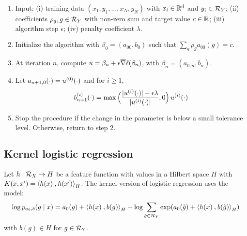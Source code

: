 \begin{algorithm}
\label{alg:log.lasso}
\begin{enumerate}[label=(\arabic*)]
\item Input: (i) training data $(x_1, y_1, \ldots, x_N, y_N)$ with $x_i\in {\mathbb{R}}^d$ and $y_i\in{\mathcal R}_Y$; (ii) coefficients $\rho_g, g\in {\mathcal R}_Y$ with non-zero sum and target value $c\in{\mathbb{R}}$; (iii) algorithm step $\epsilon$; (iv) penalty coefficient $\lambda$.
\item Initialize the algorithm with $\beta_0 = ({a_{00}}, b_0)$ such that $\sum_{g} \rho_g {a_{00}}(g) = c$.
\item At iteration $n$, compute $u = \beta_n + \epsilon \overline{\nabla} \ell(\beta_n)$, with $\beta_n = (a_{0,n}, b_n)$.
\item Let $a_{n+1,0}(\cdot) = u^{(0)}(\cdot)$ and for $i\geq 1$, 
\[
b_{n+1}^{(i)}(\cdot) = \max\Big(\frac{|u^{(i)}(\cdot)| - \epsilon\lambda}{|u^{(i)}(\cdot)|}, 0\Big)\,  u^{(i)}(\cdot)\,
\]
\item Stop the procedure if the change in the parameter is below a small tolerance level. Otherwise, return to step 2.
\end{enumerate}
\end{algorithm}




\subsection{Kernel logistic regression}
 Let $h: {\mathcal R}_X  \to H$ be a feature function with values in a Hilbert space $H$ with $K(x,x') = {\langle {h(x)}\mathbin{,} {h(x')}\rangle}_H$. 
  The kernel version of logistic regression uses the model:
\[
\log p_{{a_0}, b}(g\mid x) = {a_0}(g) +  {\langle {h(x)}\mathbin{,} {b(g)}\rangle}_H \\
- \log\sum_{\tilde g\in {\mathcal R}_Y
}\exp({a_0}(\tilde g) + {\langle {h(x)}\mathbin{,} {b(\tilde g)}\rangle}_H)
\]
with $b(g)\in H$ for $g\in {\mathcal R}_Y$. 

